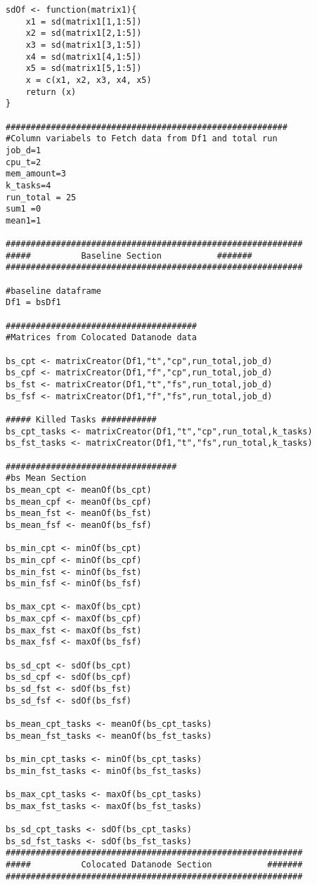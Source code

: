 \begin{verbatim}
sdOf <- function(matrix1){
	x1 = sd(matrix1[1,1:5])
	x2 = sd(matrix1[2,1:5])
	x3 = sd(matrix1[3,1:5])
	x4 = sd(matrix1[4,1:5])
	x5 = sd(matrix1[5,1:5])
	x = c(x1, x2, x3, x4, x5)
	return (x)
}

########################################################
#Column variabels to Fetch data from Df1 and total run
job_d=1
cpu_t=2
mem_amount=3
k_tasks=4
run_total = 25
sum1 =0 
mean1=1

###########################################################
#####          Baseline Section           #######
###########################################################

#baseline dataframe
Df1 = bsDf1

######################################
#Matrices from Colocated Datanode data

bs_cpt <- matrixCreator(Df1,"t","cp",run_total,job_d)
bs_cpf <- matrixCreator(Df1,"f","cp",run_total,job_d)
bs_fst <- matrixCreator(Df1,"t","fs",run_total,job_d)
bs_fsf <- matrixCreator(Df1,"f","fs",run_total,job_d)

##### Killed Tasks ###########
bs_cpt_tasks <- matrixCreator(Df1,"t","cp",run_total,k_tasks)
bs_fst_tasks <- matrixCreator(Df1,"t","fs",run_total,k_tasks)

##################################
#bs Mean Section
bs_mean_cpt <- meanOf(bs_cpt)
bs_mean_cpf <- meanOf(bs_cpf)
bs_mean_fst <- meanOf(bs_fst)
bs_mean_fsf <- meanOf(bs_fsf)

bs_min_cpt <- minOf(bs_cpt)
bs_min_cpf <- minOf(bs_cpf)
bs_min_fst <- minOf(bs_fst)
bs_min_fsf <- minOf(bs_fsf)

bs_max_cpt <- maxOf(bs_cpt)
bs_max_cpf <- maxOf(bs_cpf)
bs_max_fst <- maxOf(bs_fst)
bs_max_fsf <- maxOf(bs_fsf)

bs_sd_cpt <- sdOf(bs_cpt)
bs_sd_cpf <- sdOf(bs_cpf)
bs_sd_fst <- sdOf(bs_fst)
bs_sd_fsf <- sdOf(bs_fsf)

bs_mean_cpt_tasks <- meanOf(bs_cpt_tasks)
bs_mean_fst_tasks <- meanOf(bs_fst_tasks)

bs_min_cpt_tasks <- minOf(bs_cpt_tasks)
bs_min_fst_tasks <- minOf(bs_fst_tasks)

bs_max_cpt_tasks <- maxOf(bs_cpt_tasks)
bs_max_fst_tasks <- maxOf(bs_fst_tasks)

bs_sd_cpt_tasks <- sdOf(bs_cpt_tasks)
bs_sd_fst_tasks <- sdOf(bs_fst_tasks)
###########################################################
#####          Colocated Datanode Section           #######
###########################################################


\end{verbatim}
